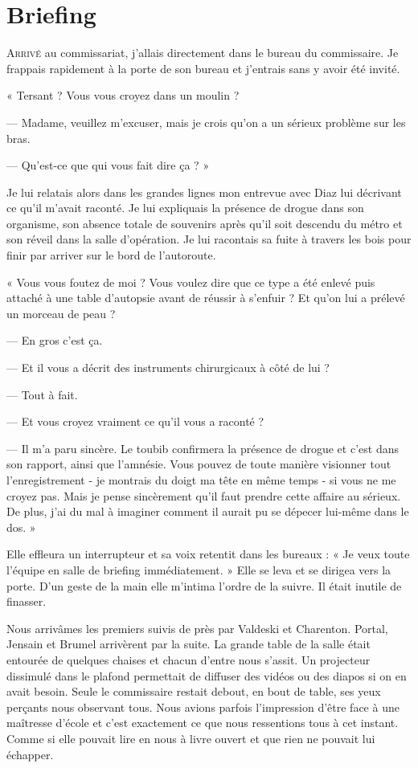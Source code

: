 \chapter{Briefing}

\lettrine{A}{rrivé} au commissariat, j'allais directement dans le bureau du commissaire. Je frappais rapidement à la 
porte de son
bureau et j'entrais sans y avoir été invité.

« Tersant ? Vous vous croyez dans un moulin ?

— Madame, veuillez m'excuser, mais je crois qu'on a un sérieux problème sur les bras.

— Qu'est-ce que qui vous fait dire ça ? »

Je lui relatais alors dans les grandes lignes mon  entrevue avec Diaz lui décrivant ce qu'il m'avait raconté. Je lui
expliquais la présence de drogue dans son organisme, son absence totale de souvenirs après qu'il soit descendu du
métro et son réveil dans la salle d'opération. Je lui racontais sa fuite à travers les bois pour finir par arriver 
sur le bord de l'autoroute.

« Vous vous foutez de moi ? Vous voulez dire que ce type a été enlevé puis attaché à une table d'autopsie avant de
réussir à s'enfuir ? Et qu'on lui a prélevé un morceau de peau ?

— En gros c'est ça.

— Et il vous a décrit des instruments chirurgicaux à côté de lui ?

— Tout à fait.

— Et vous croyez vraiment ce qu'il vous a raconté ?

— Il m'a paru sincère. Le toubib confirmera la présence de drogue et c'est dans son rapport, ainsi que l'amnésie. Vous
pouvez de toute manière visionner tout l'enregistrement - je montrais du doigt ma tête en même temps - si vous ne me
croyez pas. Mais je pense sincèrement qu'il faut prendre cette affaire au sérieux. De plus, j'ai du mal à imaginer 
comment il aurait pu se dépecer lui-même dans le dos. »

Elle effleura un interrupteur et sa voix retentit dans les bureaux : « Je veux toute l'équipe en salle de briefing
immédiatement. » Elle se leva et se dirigea vers la porte. D'un geste de la main elle m'intima l'ordre de la suivre. Il
était inutile de finasser. 

Nous arrivâmes les premiers suivis de près par Valdeski et Charenton. Portal, Jensain et Brumel arrivèrent par la 
suite. La grande table de la salle était entourée de quelques chaises et chacun d'entre nous s'assit. Un projecteur 
dissimulé  dans le plafond permettait de diffuser des vidéos ou des diapos si on en avait besoin. Seule le commissaire 
restait debout, en bout de table, ses yeux perçants nous observant tous. Nous avions parfois l'impression d'être face à 
une maîtresse d'école et c'est exactement ce que nous ressentions tous à cet instant. Comme si elle pouvait lire en nous 
à livre ouvert et que rien ne pouvait lui échapper.

